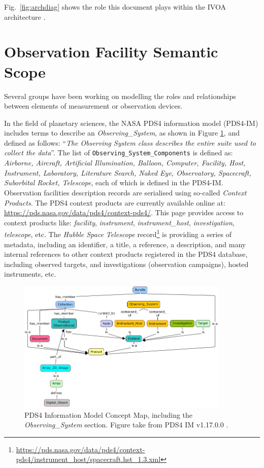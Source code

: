 \documentclass[11pt,a4paper]{ivoa}
\begin{document}
Fig.~\ref{fig:archdiag} shows the role this document plays within the
IVOA architecture \citep{2010ivoa.rept.1123A}.

\section{Observation Facility Semantic Scope}
\label{sec:scope}

Several groups have been working on modelling the roles and 
relationships between elements of measurement or observation devices. 

In the field of planetary sciences, the NASA PDS4 information model 
(PDS4-IM) includes terms to describe an \emph{Observing\_System}, as 
shown in Figure \ref{fig:pds4-concept-map}, and defined as follows:
``\emph{The Observing System class describes the entire suite used to 
collect the data}''. The list of \texttt{Observing\_System\_Components} 
is defined as: \emph{Airborne, Aircraft, Artificial Illumination, 
Balloon, Computer, Facility, Host, Instrument, Laboratory, Literature 
Search, Naked Eye, Observatory, Spacecraft, Suborbital Rocket, 
Telescope}, each of which is defined in the PDS4-IM. Observation 
facilities description records are serialised using so-called 
\emph{Context Products}. The PDS4 context products are currently available 
online at: \url{https://pds.nasa.gov/data/pds4/context-pds4/}. This 
page provides access to  context products like: \emph{facility}, 
\emph{instrument}, \emph{instrument\_host}, \emph{investigation}, 
\emph{telescope}, etc. The \emph{Hubble Space Telescope} 
record\footnote{\protect\url{https://pds.nasa.gov/data/pds4/context-pds4/instrument_host/spacecraft.hst_1.3.xml}} 
is providing a series of metadata, including an identifier, a title, 
a reference, a description, and many internal references to other 
context products registered in the PDS4 database, including 
observed targets, and investigations (observation campaigns), hosted 
instruments, etc.

\begin{figure}
\centering\includegraphics[width=0.9\textwidth]{pds4-concept-map.jpg}
\caption{PDS4 Information Model Concept Map, including the 
\emph{Observing\_System} section. Figure take from PDS4 IM v1.17.0.0 
\protect\citep{pds4-im-v1H00}.}\label{fig:pds4-concept-map}
\end{figure}
\end{document}
